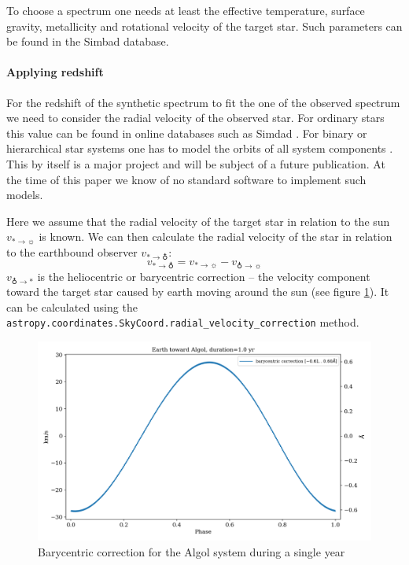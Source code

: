 \documentclass[10pt,a4paper,notitlepage,twocolumn]{article}
\begin{document}
To choose a spectrum one needs at least the effective temperature, surface gravity, metallicity and rotational velocity of the target star.
Such parameters can be found in the Simbad \cite{Simbad} database.



\paragraph{Applying redshift}

For the redshift of the synthetic spectrum to fit the one of the observed spectrum we need to consider the radial velocity of the observed star.
For ordinary stars this value can be found in online databases such as Simdad \cite{Simbad}.
For binary or hierarchical star systems one has to model the orbits of all system components \cite{Gerlach2015}.
This by itself is a major project and will be subject of a future publication.
At the time of this paper we know of no standard software to implement such models.

Here we assume that the radial velocity of the target star in relation to the sun $v_{* \rightarrow \sun}$ is known.
We can then calculate the radial velocity of the star in relation to the earthbound observer $v_{* \rightarrow \earth}$:
\begin{equation}
	\label{eq:rv}
	v_{* \rightarrow \earth} = v_{* \rightarrow \sun} - v_{\earth \rightarrow \sun}
\end{equation}
$v_{\earth \rightarrow *}$ is the heliocentric or barycentric correction -- the velocity component toward the target star caused by earth moving around the sun (see figure \ref*{algol_bary}).
It can be calculated using the \texttt{astropy.\-coordinates.\-SkyCoord.\-radial\_\-velocity\_\-correction} method.

\begin{figure}[h]
	\includegraphics[width=\columnwidth]{img/algol_bary.png}
	\caption{Barycentric correction for the Algol system during a single year}
	\label{algol_bary}
\end{figure}
\end{document}
